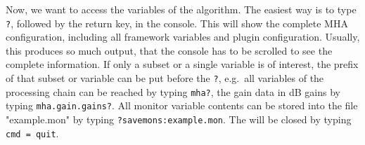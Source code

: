 Now, we want to access the variables of the algorithm. The easiest way
is to type \verb!?!, followed by the return key, in the console. This
will show the complete MHA configuration, including all framework
variables and plugin configuration. Usually, this
produces so much output, that the console has to be scrolled to see
the complete information. If only a subset or a single variable is of
interest, the prefix of that subset or variable can be put before the
\verb!?!, e.g.\ all variables of the processing chain can be reached
by typing \newline\verb!mha?!, the gain data in dB gains
by typing \newline\verb!mha.gain.gains?!. All monitor variable contents can
be stored into the file "example.mon" by typing
\verb!?savemons:example.mon!. The \mhad{} will be closed
by typing \verb!cmd = quit!.

